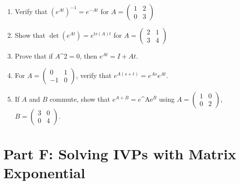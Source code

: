 \documentclass[12pt]{article}
\begin{document}
\begin{enumerate}[start=21]
\item Verify that $(e^{At})^{-1} = e^{-At}$ for $A = \begin{pmatrix} 1 & 2 \\ 0 & 3 \end{pmatrix}$

\item Show that $\det(e^{At}) = e^{\text{tr}(A)t}$ for $A = \begin{pmatrix} 2 & 1 \\ 3 & 4 \end{pmatrix}$

\item Prove that if $A$^{2}$ = 0$, then $e^{At} = I + At$.

\item For $A = \begin{pmatrix} 0 & 1 \\ -1 & 0 \end{pmatrix}$, verify that $e^{A(s+t)} = e^{As}e^{At}$.

\item If $A$ and $B$ commute, show that $e^{A+B} = e$^{Ae}$^B$ using $A = \begin{pmatrix} 1 & 0 \\ 0 & 2 \end{pmatrix}$, $B = \begin{pmatrix} 3 & 0 \\ 0 & 4 \end{pmatrix}$.
\end{enumerate}

\section*{Part F: Solving IVPs with Matrix Exponential}
\end{document}
